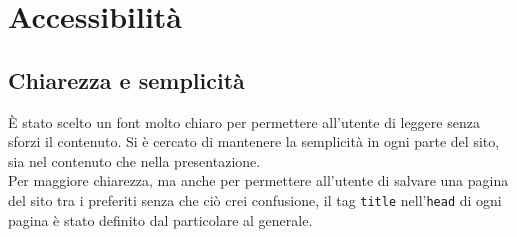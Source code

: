 \documentclass[../relazione.tex]{subfiles}
\begin{document}
\section{Accessibilità}
	\subsection{Chiarezza e semplicità}
		È stato scelto un font molto chiaro per permettere all'utente di leggere senza sforzi il contenuto. Si è cercato di mantenere la semplicità in ogni parte del sito, sia nel contenuto che nella presentazione.\\
		Per maggiore chiarezza, ma anche per permettere all'utente di salvare una pagina del sito tra i preferiti senza che ciò crei confusione, il tag \texttt{title} nell'\texttt{head} di ogni pagina è stato definito dal particolare al generale.
			
\end{document}
